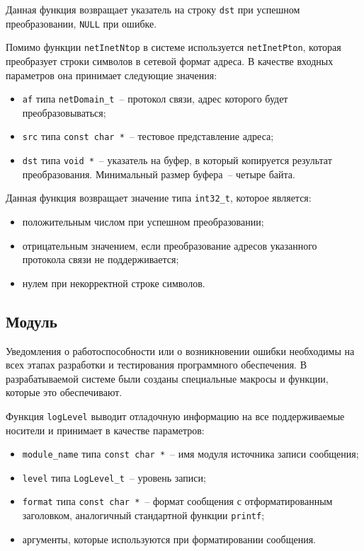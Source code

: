 Данная функция возвращает указатель на строку \lstinline{dst} при успешном преобразовании, \lstinline{NULL} при ошибке.

Помимо функции \lstinline{netInetNtop} в системе используется \lstinline{netInetPton}, которая преобразует строки символов в сетевой формат адреса. В качестве входных
параметров она принимает следующие значения:

\begin{itemize}
    \item \lstinline{af} типа \lstinline{netDomain_t}~-- протокол связи, адрес которого будет преобразовываться;
    \item \lstinline{src} типа \lstinline{const char *}~-- тестовое представление адреса;
    \item \lstinline{dst} типа \lstinline{void *}~-- указатель на буфер, в который копируется результат преобразования. Минимальный размер буфера~-- четыре байта.
\end{itemize}

Данная функция возвращает значение типа \lstinline{int32_t}, которое является:

\begin{itemize}
    \item положительным числом при успешном преобразовании;
    \item отрицательным значением, если преобразование адресов указанного протокола связи не поддерживается;
    \item нулем при некорректной строке символов.
\end{itemize}

\subsection{Модуль \moduleLog}

Уведомления о работоспособности или о возникновении ошибки необходимы на всех этапах разработки и тестирования программного обеспечения. В разрабатываемой системе
были созданы специальные макросы и
функции, которые это обеспечивают.

Функция \lstinline{logLevel} выводит отладочную информацию на все поддерживаемые
носители и принимает в качестве параметров:

\begin{itemize}
    \item \lstinline{module_name} типа \lstinline{const char *}~-- имя модуля источника записи сообщения;
    \item \lstinline{level} типа \lstinline{LogLevel_t}~-- уровень записи;
    \item \lstinline{format} типа \lstinline{const char *}~-- формат сообщения с отформатированным заголовком, аналогичный стандартной функции \lstinline{printf};
    \item аргументы, которые используются при форматировании сообщения.
\end{itemize}

